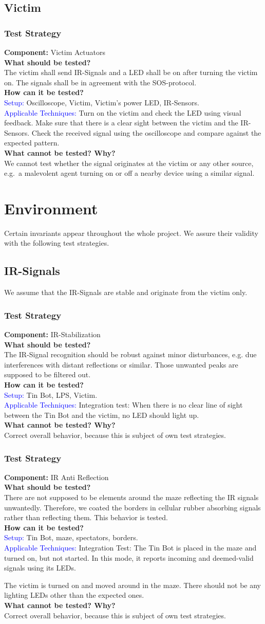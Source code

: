 \documentclass[a4paper,parskip,headheight=38pt]{scrartcl} %
\newcommand{\teststrat}[5]{
    \subsubsection{Test Strategy}
	\textbf{Component:} #1 \\
	\noindent\textbf{What should be tested?} \\
    \noindent #2 \\
	\noindent\textbf{How can it be tested?} \\
    \noindent\textcolor{blue}{Setup:} #3 \\
    \noindent\textcolor{blue}{Applicable Techniques:} #4 \\
	\noindent\textbf{What cannot be tested? Why?} \\
    \noindent #5
}
\begin{document}
\subsection{Victim}

\teststrat{Victim Actuators}{
    The victim shall send IR-Signals and a LED shall be on after turning the
    victim on. The signals shall be in agreement with the SOS-protocol.
}{
    Oscilloscope, Victim, Victim's power LED, IR-Sensors.
}{
    Turn on the victim and check the LED using visual feedback. Make sure that
    there is a clear sight between the victim and the IR-Sensors. Check the
    received signal using the oscilloscope and compare against the expected
    pattern.
}{
    We cannot test whether the signal originates at the victim or any other
    source, e.g.\ a malevolent agent turning on or off a nearby device using a
    similar signal.
}

\section{Environment}

Certain invariants appear throughout the whole project. We assure their validity
with the following test strategies.

\subsection{IR-Signals}
We assume that the IR-Signals are stable and originate from the victim only.

\teststrat{IR-Stabilization}{
    The IR-Signal recognition should be robust against minor disturbances, e.g.
    due interferences with distant reflections or similar.
    Those unwanted peaks are supposed to be filtered out.
}{
    Tin Bot, LPS, Victim.
}{
    Integration test: When there is no clear line of sight between the Tin Bot
    and the victim, no LED should light up.
}{
    Correct overall behavior, because this is subject of own test strategies.
}

\teststrat{IR Anti Reflection}{
    There are not supposed to be elements around the maze reflecting the IR
    signals unwantedly. Therefore, we coated the borders in cellular rubber
    absorbing signals rather than reflecting them. This behavior is tested.
}{
    Tin Bot, maze, spectators, borders.
}{
    Integration Test: 
    The Tin Bot is placed in the maze and turned on, but not
    started. In this mode, it reports incoming and deemed-valid signals using
    its LEDs. 

    The victim is turned on and moved around in the maze. There should not be
    any lighting LEDs other than the expected ones.
}{
    Correct overall behavior, because this is subject of own test strategies.
}
\end{document}
